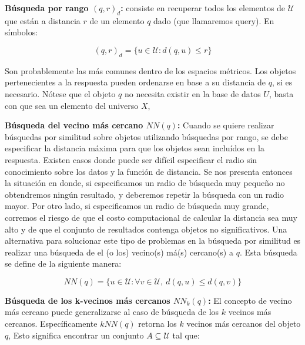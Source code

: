 \begin{description}
   \item {\textbf{B\'usqueda por rango $(q,r)_{d}$:}}
          consiste en recuperar todos los elementos  de $\mathcal{U}$
          que est\'an a distancia $r$ de un elemento $q$ dado (que llamaremos
          query).  En s\'imbolos:

           \vspace{-3mm}
          \[(q,r)_{d}=\{u \in \mathcal{U}:  d(q,u) \leq r\}\]
          
          Son probablemente las m\'as comunes dentro de los espacios
           m\'etricos.  Los objetos pertenecientes a la respuesta pueden 
           ordenarse en base a su distancia de $q$, si es necesario.
            N\'otese que el objeto $q$ no necesita existir en la base de datos $U$,
            basta con que sea un elemento del universo $X$, 

   \item{\textbf{ B\'usqueda del vecino m\'as cercano $NN(q)$:}}
         Cuando se quiere realizar b\'usquedas por similitud sobre objetos 
         utilizando b\'usquedas por rango, se debe especificar la distancia 
         m\'axima para que los objetos sean inclu\'idos en la respuesta. Existen 
         casos donde puede ser dif\'icil especificar el radio sin conocimiento
          sobre los datos y la funci\'on de distancia. 
          Se nos presenta entonces la situaci\'on en donde, si especificamos 
          un radio de b\'usqueda muy peque\~no no obtendremos ning\'un resultado, 
          y deberemos repetir la b\'usqueda con un radio mayor. 
          Por otro lado, si especificamos un radio de b\'usqueda 
          muy grande, corremos el riesgo de que el costo computacional de calcular 
          la distancia sea muy alto y de que el conjunto de resultados contenga 
          objetos no significativos. 
          Una alternativa para solucionar este tipo de problemas en la b\'usqueda por
           similitud es realizar una b\'usqueda de el (o los)  vecino(s) m\'a(s) cercano(s)
           a $q$. Esta b\'usqueda se define de la siguiente manera:

          \vspace{-3mm}
          \[ NN(q)=\{u \in \mathcal{U} : \forall v \in \mathcal{U},
          \ d(q,u) \leq d(q,v)\}\]
          

   \item {\textbf{ B\'usqueda de los k-vecinos m\'as cercanos $NN_{k}(q)$:}}
         El concepto de vecino m\'as cercano puede generalizarse al caso 
         de b\'usqueda de los $k$ vecinos m\'as cercanos. Espec\'ificamente
          $kNN(q)$ retorna los $k$ vecinos m\'as cercanos del objeto $q$, 
          Esto significa encontrar un conjunto
          $A \subseteq \mathcal{U} $ tal que:


\end{description}
